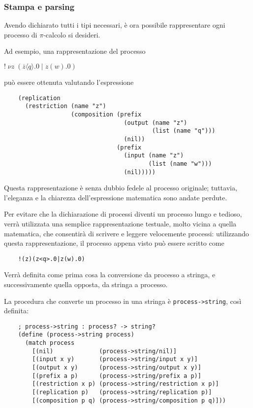 \subsubsection{Stampa e parsing}

Avendo dichiarato tutti i tipi necessari, \`e ora possibile rappresentare
ogni processo di $\pi$-calcolo si desideri.

Ad esempio, una rappresentazione del processo

\begin{pilisting}
$
    ! \; \nu z \; (
      \overline{z}\langle q\rangle.0 \; | \;
      z(w).0
    )
$
\end{pilisting}

pu\`o essere ottenuta valutando l'espressione

\begin{lstlisting}
    (replication
      (restriction (name "z")
                   (composition (prefix
                                  (output (name "z")
                                          (list (name "q")))
                                  (nil))
                                (prefix
                                  (input (name "z")
                                         (list (name "w")))
                                  (nil)))))
\end{lstlisting}

Questa rappresentazione \`e senza dubbio fedele al processo originale;
tuttavia, l'eleganza e la chiarezza dell'espressione matematica sono
andate perdute.

Per evitare che la dichiarazione di processi diventi un processo lungo
e tedioso, verr\`a utilizzata una semplice rappresentazione testuale,
molto vicina a quella matematica, che consentir\`a di scrivere e leggere
velocemente processi: utilizzando questa rappresentazione, il processo
appena visto pu\`o essere scritto come

\begin{lstlisting}
    !(z)(z<q>.0|z(w).0)
\end{lstlisting}

Verr\`a definita come prima cosa la conversione da processo a stringa,
e successivamente quella opposta, da stringa a processo.

La procedura che converte un processo in una stringa \`e
\lstinline{process->string}, cos\`i definita:

\begin{lstlisting}
    ; process->string : process? -> string?
    (define (process->string process)
      (match process
        [(nil)             (process->string/nil)]
        [(input x y)       (process->string/input x y)] 
        [(output x y)      (process->string/output x y)] 
        [(prefix a p)      (process->string/prefix a p)] 
        [(restriction x p) (process->string/restriction x p)] 
        [(replication p)   (process->string/replication p)] 
        [(composition p q) (process->string/composition p q)]))
\end{lstlisting}

